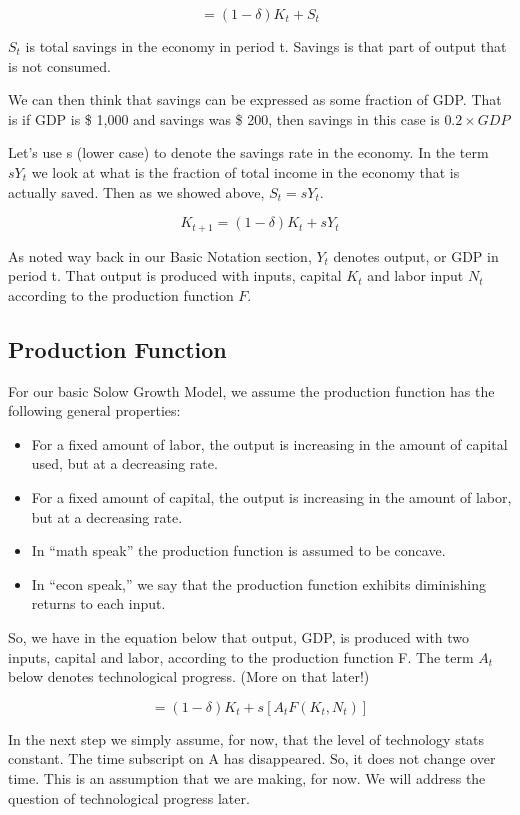 \documentclass[
]{book}
\providecommand{\tightlist}{%
  \setlength{\itemsep}{0pt}\setlength{\parskip}{0pt}}
\begin{document}
\[=(1-\delta)K_t+S_t\]

\(S_t\) is total savings in the economy in period t. Savings is that part of output that is not consumed.

We can then think that savings can be expressed as some fraction of GDP. That is if GDP is \$ 1,000 and savings was \$ 200, then savings in this case is \(0.2 \times GDP\)

Let's use s (lower case) to denote the savings rate in the economy. In the term \(sY_t\) we look at what is the fraction of total income in the economy that is actually saved. Then as we showed above, \(S_t=sY_t\).

\[K_{t+1}=(1-\delta) K_t+sY_t\]

As noted way back in our Basic Notation section, \(Y_t\) denotes output, or GDP in period t. That output is produced with inputs, capital \(K_t\) and labor input \(N_t\) according to the production function \(F\).

\hypertarget{production-function}{%
\subsection{Production Function}\label{production-function}}

For our basic Solow Growth Model, we assume the production function has the following general properties:

\begin{itemize}
\tightlist
\item
  For a fixed amount of labor, the output is increasing in the amount of capital used, but at a decreasing rate.
\item
  For a fixed amount of capital, the output is increasing in the amount of labor, but at a decreasing rate.
\item
  In ``math speak'' the production function is assumed to be concave.
\item
  In ``econ speak,'' we say that the production function exhibits diminishing returns to each input.
\end{itemize}

So, we have in the equation below that output, GDP, is produced with two inputs, capital and labor, according to the production function F. The term \(A_t\) below denotes technological progress. (More on that later!)

\[=(1-δ) K_t+s[A_t F (K_t,N_t)]\]

In the next step we simply assume, for now, that the level of technology stats constant. The time subscript on A has disappeared. So, it does not change over time. This is an assumption that we are making, for now. We will address the question of technological progress later.
\end{document}
